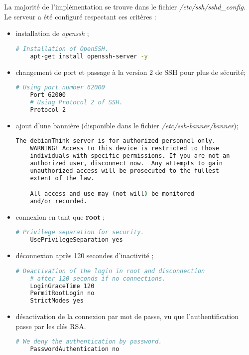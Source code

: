 La majorité de l'implémentation se trouve dans le fichier
\textit{/etc/ssh/sshd\_config}. \\
Le serveur a été configuré respectant ces critères :
\begin{itemize}
\item installation de \textit{openssh} ;

  \begin{lstlisting}[language=bash]
    # Installation of OpenSSH.
    apt-get install openssh-server -y
  \end{lstlisting}

\item changement de port et passage à la version 2 de SSH pour plus de sécurité;

  \begin{lstlisting}[language=bash]
    # Using port number 62000
    Port 62000
    # Using Protocol 2 of SSH.
    Protocol 2
  \end{lstlisting}

  \newpage

\item ajout d'une bannière (disponible dans le fichier \textit{/etc/ssh-banner/banner});

  \begin{lstlisting}[language=bash]
    The debianThink server is for authorized personnel only.
    WARNING! Access to this device is restricted to those
    individuals with specific permissions. If you are not an
    authorized user, disconnect now.  Any attempts to gain
    unauthorized access will be prosecuted to the fullest
    extent of the law.

    All access and use may (not will) be monitored
    and/or recorded.
  \end{lstlisting}

\item connexion en tant que \textbf{root} ;

  \begin{lstlisting}[language=bash]
    # Privilege separation for security.
    UsePrivilegeSeparation yes
  \end{lstlisting}

\item déconnexion après 120 secondes d'inactivité ;

  \begin{lstlisting}[language=bash]
    # Deactivation of the login in root and disconnection
    # after 120 seconds if no connections.
    LoginGraceTime 120
    PermitRootLogin no
    StrictModes yes
  \end{lstlisting}

\item désactivation de la connexion par mot de passe, vu que l'authentification
  passe par les clés RSA.

  \begin{lstlisting}[language=bash]
    # We deny the authentication by password.
    PasswordAuthentication no
  \end{lstlisting}
\end{itemize}

